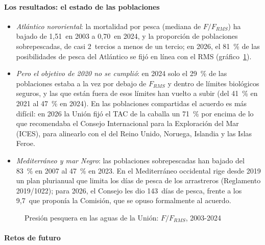 \documentclass[11pt]{article}
\begin{document}
\paragraph{Los resultados: el estado de las poblaciones}

\begin{itemize}
\item \emph{Atlántico nororiental}: la mortalidad por pesca (mediana de $F/F_{\mathit{RMS}}$) ha bajado de 1,51~en 2003 a 0,70~en 2024, y la proporción de poblaciones sobrepescadas, de casi 2~tercios a menos de un tercio; en 2026, el 81~\% de las posibilidades de pesca del Atlántico se fijó en línea con el RMS (gráfico~\ref{fig:poblaciones})\nocite{STECF2026,CE2026Pesca2027}.
\item \emph{Pero el objetivo de 2020 no se cumplió}: en 2024 solo el 29~\% de las poblaciones estaba a la vez por debajo de $F_{\mathit{RMS}}$ y dentro de límites biológicos seguros, y las que están fuera de esos límites han vuelto a subir (del 41~\% en 2021 al 47~\% en 2024). En las poblaciones compartidas el acuerdo es más difícil: en 2026 la Unión fijó el TAC de la caballa un 71~\% por encima de lo que recomendaba el Consejo Internacional para la Exploración del Mar (ICES), para alinearlo con el del Reino Unido, Noruega, Islandia y las Islas Feroe.
\item \emph{Mediterráneo y mar Negro}: las poblaciones sobrepescadas han bajado del 83~\% en 2007 al 47~\% en 2023. En el Mediterráneo occidental rige desde 2019 un plan plurianual que limita los días de pesca de los arrastreros (Reglamento 2019/1022); para 2026, el Consejo les dio 143~días de pesca, frente a los 9,7~que proponía la Comisión, que se opuso formalmente al acuerdo\nocite{MAPA2025Posibilidades,CE2026Pesca2027}.
\end{itemize}

\begin{figure}[H]
\centering
\caption{Presión pesquera en las aguas de la Unión: $F/F_{\mathit{RMS}}$, 2003-2024}\label{fig:poblaciones}
\end{figure}

\paragraph{Retos de futuro}
\end{document}
